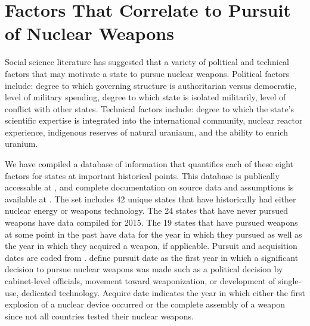 \section{Factors That Correlate to Pursuit of Nuclear Weapons}
\label{s_factors}

Social science literature has suggested that a variety of political and technical factors that may motivate a state to pursue nuclear weapons. Political factors include: degree to which governing structure is authoritarian versus democratic, level of military spending, degree to which state is isolated militarily, level of conflict with other states. Technical factors include: degree to which the state's scientific expertise is integrated into the international community, nuclear reactor experience, indigenous reserves of natural uraniaum, and the ability to enrich uranium.  

We have compiled a database of information that quantifies each of these eight factors for states at important historical points. This database is publically accessable at , and complete documentation on source data and assumptions is available at .  The set includes 42 unique states that have historically had either nuclear energy or weapons technology.  The 24 states that have never pursued weapons have data compiled for 2015. The 19 states that have pursued weapons at some point in the past have data for the year in which they pursued as well as the year in which they acquired a weapon, if applicable. Pursuit and acquisition dates are coded from .   define pursuit date as the first year in which a significant decision to pursue nuclear weapons was made such as a political decision by cabinet-level officials, movement toward weaponization, or development of single-use, dedicated technology.  Acquire date indicates the year in which either the first explosion of a nuclear device occurred or the complete assembly of a weapon since not all countries tested their nuclear weapons.

